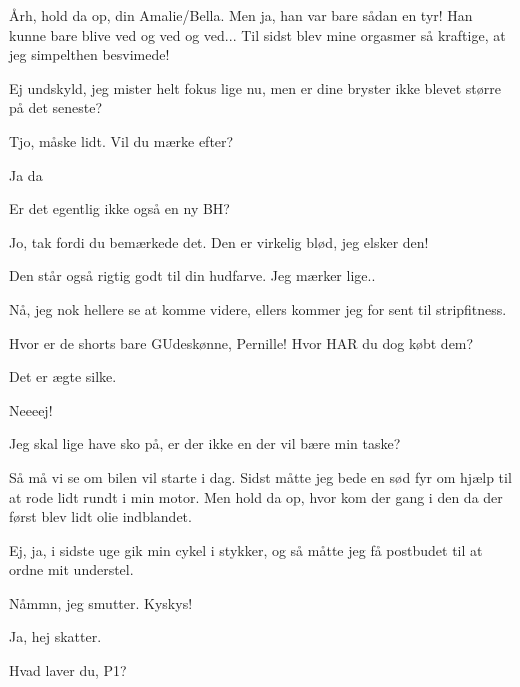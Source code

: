 \documentclass[a4paper,11pt]{article}
\begin{document}
\begin{sketch}
 Årh, hold da op, din Amalie/Bella. Men ja, han var bare sådan en tyr! Han kunne bare blive ved og ved og ved... Til sidst blev mine orgasmer så kraftige, at jeg simpelthen besvimede!

 Ej undskyld, jeg mister helt fokus lige nu, men er dine bryster ikke blevet større på det seneste?

 Tjo, måske lidt. Vil du mærke efter?

 Ja da 

 Er det egentlig ikke også en ny BH?

 Jo, tak fordi du bemærkede det. Den er virkelig blød, jeg elsker den!

 Den står også rigtig godt til din hudfarve. Jeg mærker lige.. 

 Nå, jeg nok hellere se at komme videre, ellers kommer jeg for sent til stripfitness.

 Hvor er de shorts bare GUdeskønne, Pernille! Hvor HAR du dog købt dem?

 Det er ægte silke.

 Neeeej!


 Jeg skal lige have sko på, er der ikke en der vil bære min taske? 

 Så må vi se om bilen vil starte i dag. Sidst måtte jeg bede en sød fyr om hjælp til at rode lidt rundt i min motor. Men hold da op, hvor kom der gang i den da der først blev lidt olie indblandet.

 Ej, ja, i sidste uge gik min cykel i stykker, og så måtte jeg få postbudet til at ordne mit understel.

 Nåmmn, jeg smutter. Kyskys!

 Ja, hej skatter.


 Hvad laver du, P1?


\end{sketch}
\end{document}
